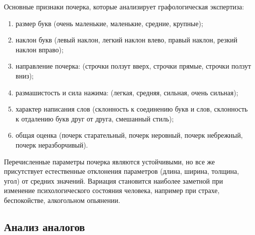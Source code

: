 Основные признаки почерка, которые анализирует графологическая экспертиза:
\begin{enumerate}
  \item размер букв (очень маленькие, маленькие, средние, крупные);
  \item наклон букв (левый наклон, легкий наклон влево, правый наклон, резкий наклон вправо);
  \item направление почерка: (строчки ползут вверх, строчки прямые, строчки ползут вниз);
  \item размашистость и сила нажима: (легкая, средняя, сильная, очень сильная);
  \item характер написания слов (склонность к соединению букв и слов, склонность к отдалению букв друг от друга, смешанный стиль);
  \item общая оценка (почерк старательный, почерк неровный, почерк небрежный, почерк неразборчивый).
\end{enumerate}

Перечисленные параметры почерка являются устойчивыми, но все же присутствует естественные отклонения параметров (длина, ширина, толщина, угол) от средних значений. Вариация становится наиболее заметной при изменение психологического состояния человека, например при страхе, беспокойстве, алкогольном опьянении.

\subsection{Анализ аналогов}
\label{sub:domain:analogs}
